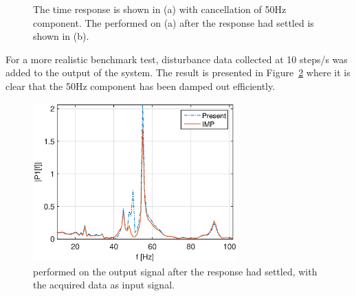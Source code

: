 \begin{figure}[h!]
  \centering %
  \qquad
  \caption{\label{fig:rfdc_p_atten} The time response is shown in (a) with cancellation of 50Hz component. The \abbrFFT performed on (a) after the response had settled is shown in (b).}
\end{figure}

For a more realistic benchmark test, disturbance data collected at 10 steps/s was added to the output of the system. The result is presented in Figure~\ref{fig:imp_realdata} where it is clear that the 50Hz component has been damped out efficiently.

\begin{figure}[h!]
  \centering
  \includegraphics[width=0.7\textwidth]{fig/matlab/distrej_realstep_fft.eps}
  \caption{\label{fig:imp_realdata} \abbrFFT performed on the output signal after the response had settled, with the acquired data as input signal.}
\end{figure}

